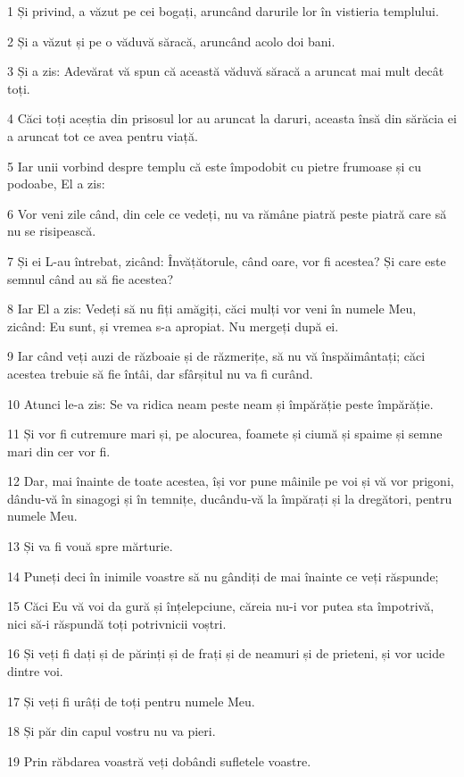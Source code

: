 \par 1 Și privind, a văzut pe cei bogați, aruncând darurile lor în vistieria templului.
\par 2 Și a văzut și pe o văduvă săracă, aruncând acolo doi bani.
\par 3 Și a zis: Adevărat vă spun că această văduvă săracă a aruncat mai mult decât toți.
\par 4 Căci toți aceștia din prisosul lor au aruncat la daruri, aceasta însă din sărăcia ei a aruncat tot ce avea pentru viață.
\par 5 Iar unii vorbind despre templu că este împodobit cu pietre frumoase și cu podoabe, El a zis:
\par 6 Vor veni zile când, din cele ce vedeți, nu va rămâne piatră peste piatră care să nu se risipească.
\par 7 Și ei L-au întrebat, zicând: Învățătorule, când oare, vor fi acestea? Și care este semnul când au să fie acestea?
\par 8 Iar El a zis: Vedeți să nu fiți amăgiți, căci mulți vor veni în numele Meu, zicând: Eu sunt, și vremea s-a apropiat. Nu mergeți după ei.
\par 9 Iar când veți auzi de războaie și de răzmerițe, să nu vă înspăimântați; căci acestea trebuie să fie întâi, dar sfârșitul nu va fi curând.
\par 10 Atunci le-a zis: Se va ridica neam peste neam și împărăție peste împărăție.
\par 11 Și vor fi cutremure mari și, pe alocurea, foamete și ciumă și spaime și semne mari din cer vor fi.
\par 12 Dar, mai înainte de toate acestea, își vor pune mâinile pe voi și vă vor prigoni, dându-vă în sinagogi și în temnițe, ducându-vă la împărați și la dregători, pentru numele Meu.
\par 13 Și va fi vouă spre mărturie.
\par 14 Puneți deci în inimile voastre să nu gândiți de mai înainte ce veți răspunde;
\par 15 Căci Eu vă voi da gură și înțelepciune, căreia nu-i vor putea sta împotrivă, nici să-i răspundă toți potrivnicii voștri.
\par 16 Și veți fi dați și de părinți și de frați și de neamuri și de prieteni, și vor ucide dintre voi.
\par 17 Și veți fi urâți de toți pentru numele Meu.
\par 18 Și păr din capul vostru nu va pieri.
\par 19 Prin răbdarea voastră veți dobândi sufletele voastre.
